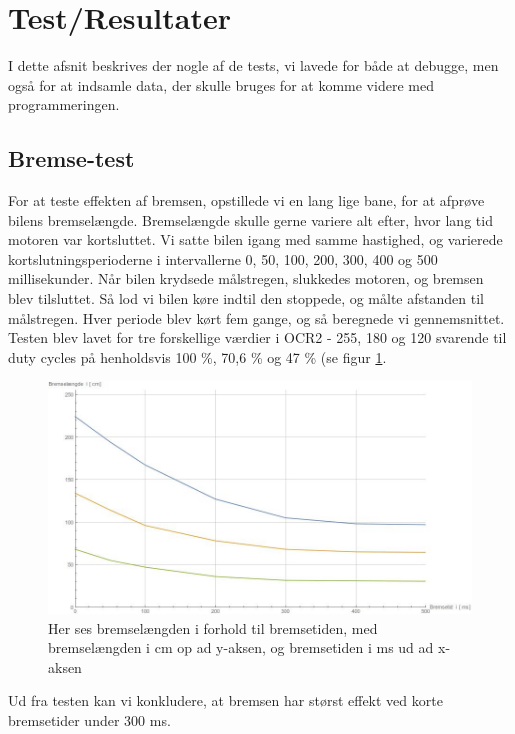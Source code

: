 \section{Test/Resultater}

I dette afsnit beskrives der nogle af de tests, vi lavede for både at debugge, men også for at indsamle data, der skulle bruges for at komme videre med programmeringen.

\subsection{Bremse-test}

For at teste effekten af bremsen, opstillede vi en lang lige bane, for at afprøve bilens bremselængde. Bremselængde skulle gerne variere alt efter, hvor lang tid motoren var kortsluttet. Vi satte bilen igang med samme hastighed, og varierede kortslutningsperioderne i intervallerne 0, 50, 100, 200, 300, 400 og 500 millisekunder. Når bilen krydsede målstregen, slukkedes motoren, og bremsen blev tilsluttet. Så lod vi bilen køre indtil den stoppede, og målte afstanden til målstregen. Hver periode blev kørt fem gange, og så beregnede vi gennemsnittet. Testen blev lavet for tre forskellige værdier i OCR2 - 255, 180 og 120 svarende til duty cycles på henholdsvis 100 \%, 70,6 \% og 47 \% (se figur \ref{fig:Bremselir}. 

\begin{figure}[h]

	\centering
		\includegraphics[scale=0.4]{Billeder/Bremse.jpeg}
	\caption{Her ses bremselængden i forhold til bremsetiden, med bremselængden i cm op ad y-aksen, og bremsetiden i ms ud ad x-aksen}
	\label{fig:Bremselir}
	
\end{figure}

Ud fra testen kan vi konkludere, at bremsen har størst effekt ved korte bremsetider under 300 ms.

